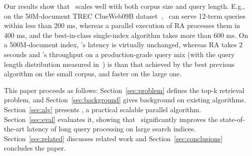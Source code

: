 Our results show that \alg\ scales well with both  corpus size and query length.
E.g., on the 50M-document TREC ClueWeb09B dataset~\cite{ClueWeb09}, %
\alg\ can serve  12-term queries within less than 200 ms, 
whereas a parallel execution of RA processes them in 400 ms, and the best-in-class single-index algorithm  
takes more than 600 ms. 
%
On a 500M-document index,  \alg's latency is virtually unchanged, whereas 
 RA takes 2 seconds and 
\alg's throughput on a production-grade query mix (with the query length distribution measured in~\cite{sigir/Guy16}) is 
 than that achieved by the best previous algorithm  
 on the small corpus, and  faster on the large one.

%
This paper proceeds as follows: 
Section~\ref{sec:problem} defines the top-k retrieval problem, and  %
Section~\ref{sec:background} gives background on existing algorithms. 
Section~\ref{sec:alg} presents \alg, a practical scalable parallel algorithm. 
Section~\ref{sec:eval}  evaluates it, showing  that \alg\  significantly improves the state-of-the-art latency  of long query processing on large search indices.
Section~\ref{sec:related} discusses related work and Section~\ref{sec:conclusions} concludes the paper.
